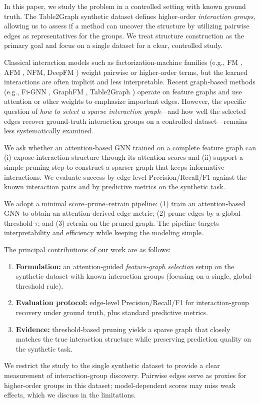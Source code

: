 \documentclass[10pt,a4paper]{article}
\begin{document}
In this paper, we study the problem in a controlled setting with known ground truth. The Table2Graph \cite{Table2Graph} synthetic dataset defines higher-order \emph{interaction groups}, allowing us to assess if a method can uncover the structure by utilizing pairwise edges as representatives for the groups. We treat structure construction as the primary goal and focus on a single dataset for a clear, controlled study.

Classical interaction models such as factorization-machine families (e.g., FM \cite{FM}, AFM \cite{AFM}, NFM\cite{He2017NeuralFM}, DeepFM \cite{DeepFM}) weight pairwise or higher-order terms, but the learned interactions are often implicit and less interpretable. Recent graph-based methods (e.g., Fi-GNN \cite{fignn}, GraphFM \cite{GraphFM}, Table2Graph \cite{Table2Graph}) operate on feature graphs and use attention or other weights to emphasize important edges. However, the specific question of \emph{how to select a sparse interaction graph}—and how well the selected edges recover ground-truth interaction groups on a controlled dataset—remains less systematically examined.

We ask whether an attention-based GNN trained on a complete feature graph can (i) expose interaction structure through its attention scores and (ii) support a simple pruning step to construct a sparser graph that keeps informative interactions. We evaluate success by edge-level Precision/Recall/F1 against the known interaction pairs and by predictive metrics on the synthetic task.

We adopt a minimal score–prune–retrain pipeline: (1) train an attention-based GNN to obtain an attention-derived edge metric; (2) prune edges by a global threshold $\tau$; and (3) retrain on the pruned graph. The pipeline targets interpretability and efficiency while keeping the modeling simple.

The principal contributions of our work are as follows:
\begin{enumerate}
    \item \textbf{Formulation:} an attention-guided \emph{feature-graph selection} setup on the synthetic dataset with known interaction groups (focusing on a single, global-threshold rule).
    \item \textbf{Evaluation protocol:} edge-level Precision/Recall/F1 for interaction-group recovery under ground truth, plus standard predictive metrics.
    \item \textbf{Evidence:} threshold-based pruning yields a sparse graph that closely matches the true interaction structure while preserving prediction quality on the synthetic task.
\end{enumerate}
We restrict the study to the single synthetic dataset to provide a clear measurement of interaction-group discovery. Pairwise edges serve as proxies for higher-order groups in this dataset; model-dependent scores may miss weak effects, which we discuss in the limitations.
\end{document}
